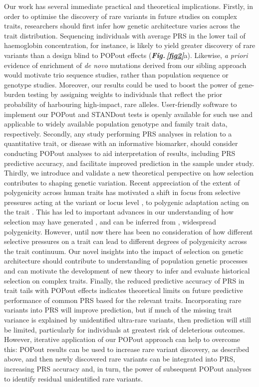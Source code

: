 \documentclass[12pt]{zHenriquesLab-StyleBioRxiv}
\newcommand\fref[1]{\normalsize{\textbf{\textit{Fig.\,\ref{#1}}}}\normalsize{}}
\begin{document}
Our work has several immediate practical and theoretical implications. 
Firstly, in order to optimise the discovery of rare variants in future 
studies on complex traits, researchers should first infer how genetic 
architecture varies across the trait distribution. 
Sequencing individuals with average PRS in the lower tail of 
haemoglobin concentration, for instance, is likely to yield greater 
discovery of rare variants than a design blind to POPout 
effects (\fref{fig2}{a}). Likewise, \emph{a priori} evidence of enrichment of \emph{de 
novo} mutations derived from our sibling approach \cite{Souaiaia2024} 
would motivate trio sequence studies, rather than population 
sequence or genotype studies. Moreover, our results could be 
used to boost the power of gene-burden testing \cite{Lee2012}
by assigning weights to individuals that reflect the prior probability 
of harbouring high-impact, rare alleles. User-friendly software 
to implement our POPout and STANDout tests is openly available 
for such use and applicable to widely available population 
genotype and family trait data, respectively. Secondly, 
any study performing PRS analyses in relation to a quantitative trait, 
or disease with an informative biomarker, should consider 
conducting POPout analyses to aid interpretation of results, 
including PRS predictive accuracy, and facilitate improved prediction 
in the sample under study. Thirdly, we introduce and validate a new 
theoretical perspective on how selection contributes 
to shaping genetic variation. Recent appreciation of the extent 
of polygenicity across human traits has motivated a shift 
in focus from selective pressures acting at the 
variant or locus level \cite{Sabeti2002,Paul2008}, 
to polygenic adaptation acting on the trait \cite{Pritchard2010,Hollinger2019}. 
This has led to important advances in our understanding 
of how selection may have generated \cite{Oconnor2019}, 
and can be inferred from \cite{Barghi2020}, 
widespread polygenicity. However, until now there has been 
no consideration of how different selective pressures on a trait 
can lead to different degrees of polygenicity across the trait continuum. 
Our novel insights into the impact of selection on genetic architecture 
should contribute to understanding of population genetic processes and can motivate 
the development of new theory to infer and evaluate historical selection on complex traits. 
Finally, the reduced predictive accuracy of PRS in trait tails 
with POPout effects indicates theoretical limits on future predictive 
performance of common PRS based for the relevant traits. 
Incorporating rare variants into PRS will improve prediction, but if much of 
the missing trait variance is explained by unidentified ultra-rare variants, 
then prediction will still be limited, particularly for individuals at greatest risk of deleterious outcomes. 
However, iterative application of our POPout approach can help to overcome this: POPout results 
can be used to increase rare variant discovery, as described above, and then newly discovered rare 
variants can be integrated into PRS, increasing PRS accuracy and, in turn, the power of subsequent 
POPout analyses to identify residual unidentified rare variants. 
\end{document}
